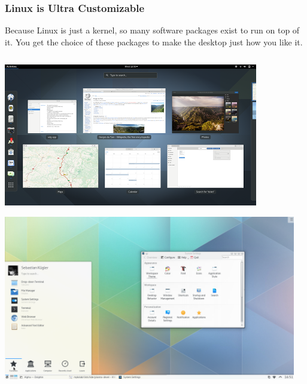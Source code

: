 \documentclass{lug}
\begin{document}
\begin{frame}
    \frametitle{Linux is Ultra Customizable}

    Because Linux is just a kernel, so many software packages exist to run on
    top of it. You get the choice of these packages to make the desktop just
    how you like it.

    \bigskip


    \begin{columns}
        \begin{column}{0.3\textwidth}
            \includegraphics[width=\textwidth]{graphics/gnome} \par
            \vspace*{4pt}
            \includegraphics[width=\textwidth]{graphics/kde} \par
        \end{column}
        \begin{column}{0.3\textwidth}

\end{column}
\end{columns}
\end{frame}
\end{document}
